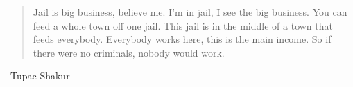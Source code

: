 \documentclass[letterpaper, landscape]{exam}
\begin{document}
  \else
    \vspace{10 cm}
    \begin{quote}
      \begin{em}
        Jail is big business, believe me. I'm in jail, I see the big business.
        You can feed a whole town off one jail. This jail is in the middle of a
        town that feeds everybody. Everybody works here, this is the main
        income. So if there were no criminals, nobody would work.
      \end{em}
    \end{quote}
    \hspace{2 cm} --Tupac Shakur
  \fi
\end{document}
